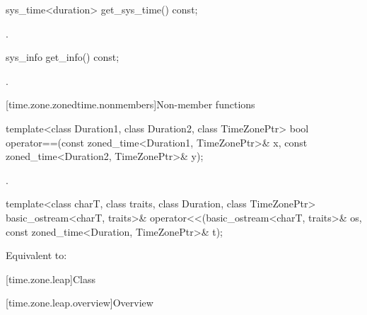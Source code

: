 %
\begin{itemdecl}
sys_time<duration> get_sys_time() const;
\end{itemdecl}

\begin{itemdescr}
\pnum
\returns
{}.
\end{itemdescr}

%
\begin{itemdecl}
sys_info get_info() const;
\end{itemdecl}

\begin{itemdescr}
\pnum
\returns
{}.
\end{itemdescr}

[time.zone.zonedtime.nonmembers]{Non-member functions}

%
\begin{itemdecl}
template<class Duration1, class Duration2, class TimeZonePtr>
  bool operator==(const zoned_time<Duration1, TimeZonePtr>& x,
                  const zoned_time<Duration2, TimeZonePtr>& y);
\end{itemdecl}

\begin{itemdescr}
\pnum
\returns
{}.
\end{itemdescr}

%
\begin{itemdecl}
template<class charT, class traits, class Duration, class TimeZonePtr>
  basic_ostream<charT, traits>&
    operator<<(basic_ostream<charT, traits>& os,
               const zoned_time<Duration, TimeZonePtr>& t);
\end{itemdecl}

\begin{itemdescr}
\pnum
\effects
Equivalent to:
\end{itemdescr}

[time.zone.leap]{Class }

[time.zone.leap.overview]{Overview}

